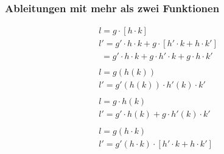 \subsubsection{Ableitungen mit mehr als zwei Funktionen}
\begin{gather*}
  l = g \cdot [h \cdot k] \\
  l' = g' \cdot h \cdot k + g \cdot [h' \cdot k + h \cdot k'] \\
  \;= g' \cdot h \cdot k + g \cdot h' \cdot k + g \cdot h \cdot k' \\\\
  l = g(h(k)) \\
  l' = g'(h(k)) \cdot h'(k) \cdot k' \\\\
  l = g \cdot h(k) \\
  l' = g' \cdot h(k) + g \cdot h'(k) \cdot k' \\\\
  l = g(h \cdot k) \\
  l' = g'(h \cdot k) \cdot [h' \cdot k + h \cdot k']
\end{gather*}
